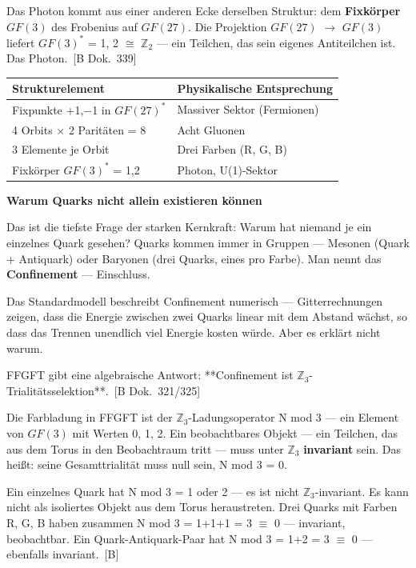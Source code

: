 \documentclass[11pt,oneside]{book}
\newcommand{\status}[1]{\penalty10000\,{\scriptsize\textcolor{gray!60}{[#1]}}}
\begin{document}
Das Photon kommt aus einer anderen Ecke derselben Struktur: dem
\textbf{Fixkörper $GF(3)$} des Frobenius auf $GF(27)$. Die Projektion
$GF(27)$ $\to$ $GF(3)$ liefert $GF(3)^*$ = {1, 2} $\cong$ $\mathbb{Z}_2$ — ein Teilchen, das
sein eigenes Antiteilchen ist. Das Photon. \status{B Dok.~339}


\begin{center}
\small
\begin{tabular}{ll}
\toprule
Strukturelement & Physikalische Entsprechung \\
\midrule
Fixpunkte {+1,$-$1} in $GF(27)^*$ & Massiver Sektor (Fermionen) \\
4 Orbits $\times$ 2 Paritäten = 8 & Acht Gluonen \\
3 Elemente je Orbit & Drei Farben (R, G, B) \\
Fixkörper $GF(3)^*$ = {1,2} & Photon, U(1)-Sektor \\
\bottomrule
\end{tabular}
\end{center}

\textbf{Warum Quarks nicht allein existieren können}


Das ist die tiefste Frage der starken Kernkraft: Warum hat niemand
je ein einzelnes Quark gesehen? Quarks kommen immer in Gruppen —
Mesonen (Quark + Antiquark) oder Baryonen (drei Quarks, eines pro Farbe).
Man nennt das \textbf{Confinement} — Einschluss.


Das Standardmodell beschreibt Confinement numerisch — Gitterrechnungen
zeigen, dass die Energie zwischen zwei Quarks linear mit dem Abstand
wächst, so dass das Trennen unendlich viel Energie kosten würde. Aber
es erklärt nicht warum.


FFGFT gibt eine algebraische Antwort: **Confinement ist
$\mathbb{Z}_3$-Trialitätsselektion**. \status{B Dok.~321/325}


Die Farbladung in FFGFT ist der $\mathbb{Z}_3$-Ladungsoperator N mod 3 — ein Element
von $GF(3)$ mit Werten {0, 1, 2}. Ein beobachtbares Objekt — ein Teilchen,
das aus dem Torus in den Beobachtraum tritt — muss unter $\mathbb{Z}_3$
\textbf{invariant} sein. Das heißt: seine Gesamttrialität muss null sein,
N mod 3 = 0.


Ein einzelnes Quark hat N mod 3 = 1 oder 2 — es ist nicht $\mathbb{Z}_3$-invariant.
Es kann nicht als isoliertes Objekt aus dem Torus heraustreten. Drei
Quarks mit Farben {R, G, B} haben zusammen N mod 3 = 1+1+1 = 3 $\equiv$ 0 —
invariant, beobachtbar. Ein Quark-Antiquark-Paar hat N mod 3 = 1+2 = 3
$\equiv$ 0 — ebenfalls invariant. \status{B}
\end{document}

